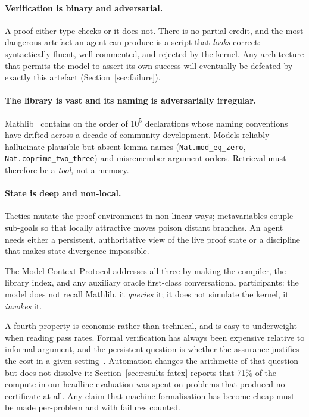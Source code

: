 \documentclass[12pt, a4paper]{article}
\begin{document}
\paragraph{Verification is binary and adversarial.} A proof either
type-checks or it does not. There is no partial credit, and the most
dangerous artefact an agent can produce is a script that \emph{looks}
correct: syntactically fluent, well-commented, and rejected by the kernel.
Any architecture that permits the model to assert its own success will
eventually be defeated by exactly this artefact (Section~\ref{sec:failure}).

\paragraph{The library is vast and its naming is adversarially irregular.}
Mathlib~\cite{mathlib2020} contains on the order of $10^5$ declarations whose naming
conventions have drifted across a decade of community development. Models
reliably hallucinate plausible-but-absent lemma names
(\texttt{Nat.mod\_eq\_zero}, \texttt{Nat.coprime\_two\_three}) and
misremember argument orders. Retrieval must therefore be a \emph{tool},
not a memory.

\paragraph{State is deep and non-local.} Tactics mutate the proof
environment in non-linear ways; metavariables couple sub-goals so that
locally attractive moves poison distant branches. An agent needs either a
persistent, authoritative view of the live proof state or a discipline that
makes state divergence impossible.

The Model Context Protocol addresses all three by making the compiler, the
library index, and any auxiliary oracle first-class conversational
participants: the model does not recall Mathlib, it \emph{queries} it; it
does not simulate the kernel, it \emph{invokes} it.

A fourth property is economic rather than technical, and is easy to
underweight when reading pass rates. Formal verification has always been
expensive relative to informal argument, and the persistent question is
whether the assurance justifies the cost in a given
setting~\cite{cook_formalmethods}. Automation changes the arithmetic of that
question but does not dissolve it: Section~\ref{sec:results-fatex} reports
that 71\% of the compute in our headline evaluation was spent on problems
that produced no certificate at all. Any claim that machine formalisation
has become cheap must be made per-problem and with failures counted.
\end{document}
